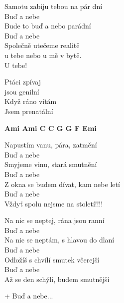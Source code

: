 
\ve{}
Samotu zabiju tebou na pár dní\\
Buď a nebe\\
Bude to buď a nebo parádní\\
Buď a nebe\\
Společně utečeme realitě\\
u tebe nebo u mě v bytě.\\
U tebe!

\cho{}
Ptáci zpívaj\\
jsou genilní\\
Když ráno vítám\\
Jsem prenatální

\re{}
{\footnotesize \textbf{Ami Ami C C G G F Emi}}

\ve{}
Napustím vanu, pára, zatmění\\
Buď a nebe\\
Smyjeme vinu, stará smutnění\\
Buď a nebe\\
Z okna se budem dívat, kam nebe letí\\
Buď a nebe\\
Vždyť spolu nejsme na století!!!!

\ve{}
Na nic se neptej, rána jsou ranní\\
Buď a nebe\\
Na nic se neptám, s hlavou do dlaní\\
Buď a nebe\\
Odložíš s chvílí smutek včerejší\\
Buď a nebe\\
Až se den schýlí, budem smutnější

\cho{} + Buď a nebe...

\esong